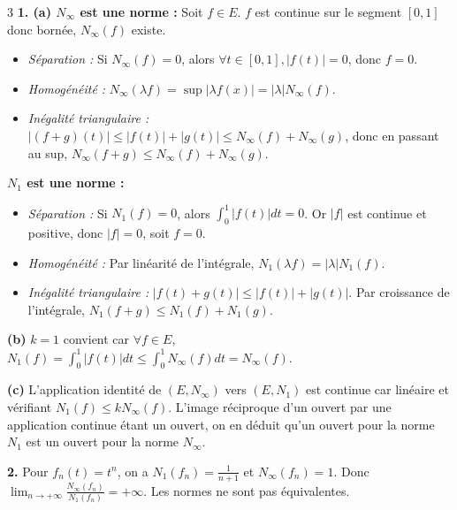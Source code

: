 \begin{correction}{3}
\textbf{1. (a) $N_\infty$ est une norme :}
Soit $f \in E$. $f$ est continue sur le segment $[0,1]$ donc bornée, $N_\infty(f)$ existe.
\begin{itemize}
    \item \textit{Séparation :} Si $N_\infty(f) = 0$, alors $\forall t \in [0,1], |f(t)| = 0$, donc $f=0$.
    \item \textit{Homogénéité :} $N_\infty(\lambda f) = \sup |\lambda f(x)| = |\lambda| N_\infty(f)$.
    \item \textit{Inégalité triangulaire :} $|(f+g)(t)| \le |f(t)| + |g(t)| \le N_\infty(f) + N_\infty(g)$, donc en passant au sup, $N_\infty(f+g) \le N_\infty(f) + N_\infty(g)$.
\end{itemize}

\textbf{$N_1$ est une norme :}
\begin{itemize}
    \item \textit{Séparation :} Si $N_1(f) = 0$, alors $\int_0^1 |f(t)| dt = 0$. Or $|f|$ est continue et positive, donc $|f|=0$, soit $f=0$.
    \item \textit{Homogénéité :} Par linéarité de l'intégrale, $N_1(\lambda f) = |\lambda| N_1(f)$.
    \item \textit{Inégalité triangulaire :} $|f(t)+g(t)| \le |f(t)| + |g(t)|$. Par croissance de l'intégrale, $N_1(f+g) \le N_1(f) + N_1(g)$.
\end{itemize}

\textbf{(b)} $k=1$ convient car $\forall f \in E$, $N_1(f) = \int_0^1 |f(t)| dt \le \int_0^1 N_\infty(f) dt = N_\infty(f)$.

\textbf{(c)} L'application identité de $(E, N_\infty)$ vers $(E, N_1)$ est continue car linéaire et vérifiant $N_1(f) \le k N_\infty(f)$.
L'image réciproque d'un ouvert par une application continue étant un ouvert, on en déduit qu'un ouvert pour la norme $N_1$ est un ouvert pour la norme $N_\infty$.

\textbf{2.} Pour $f_n(t) = t^n$, on a $N_1(f_n) = \frac{1}{n+1}$ et $N_\infty(f_n) = 1$.
Donc $\lim_{n \to +\infty} \frac{N_\infty(f_n)}{N_1(f_n)} = +\infty$. Les normes ne sont pas équivalentes.
\end{correction}

